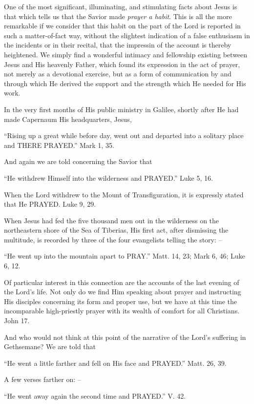 \documentclass[
]{book}
\begin{document}
One of the most significant, illuminating, and stimulating facts about Jesus is that which tells us that the Savior made \emph{prayer a habit}. This is all the more remarkable if we consider that this habit on the part of the Lord is reported in such a matter-of-fact way, without the slightest indication of a false enthusiasm in the incidents or in their recital, that the impressin of the account is thereby heightened. We simply find a wonderful intimacy and fellowship existing between Jesus and His heavenly Father, which found its expression in the act of prayer, not merely as a devotional exercise, but as a form of communication by and through which He derived the support and the strength which He needed for His work.

In the very first months of His public ministry in Galilee, shortly after He had made Capernaum His headquarters, Jesus,

``Rising up a great while before day, went out and departed into a solitary place and THERE PRAYED.'' Mark 1, 35.

And again we are told concerning the Savior that

``He withdrew Himself into the wilderness and PRAYED.'' Luke 5, 16.

When the Lord withdrew to the Mount of Transfiguration, it is expressly stated that He PRAYED. Luke 9, 29.

When Jesus had fed the five thousand men out in the wilderness on the northeastern shore of the Sea of Tiberias, His first act, after dismissing the multitude, is recorded by three of the four evangelists telling the story: --

``He went up into the mountain apart to PRAY.'' Matt. 14, 23; Mark 6, 46; Luke 6, 12.

Of particular interest in this connection are the accounts of the last evening of the Lord's life. Not only do we find Him speaking about prayer and instructing His disciples concerning its form and proper use, but we have at this time the incomparable high-priestly prayer with its wealth of comfort for all Christians. John 17.

And who would not think at this point of the narrative of the Lord's suffering in Gethsemane? We are told that

``He went a little farther and fell on His face and PRAYED.'' Matt. 26, 39.

A few verses farther on: --

``He went away again the second time and PRAYED.'' V. 42.
\end{document}
